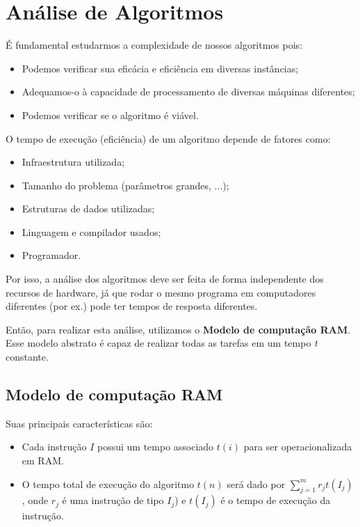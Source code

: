 \section{Análise de Algoritmos} 

É fundamental estudarmos a complexidade de nossos algoritmos pois:

\begin{itemize}
  \item Podemos verificar sua eficácia e eficiência em diversas instâncias;
  \item Adequamos-o à capacidade de processamento de diversas máquinas diferentes;
  \item Podemos verificar se o algoritmo é viável.
\end{itemize}

O tempo de execução (eficiência) de um algoritmo depende de fatores como:

\begin{itemize}
  \item Infraestrutura utilizada;
  \item Tamanho do problema (parâmetros grandes, ...);
  \item Estruturas de dados utilizadas;
  \item Linguagem e compilador usados;
  \item Programador.
\end{itemize}

Por isso, a análise dos algoritmos deve ser feita de forma independente dos recursos de hardware, já que rodar o mesmo programa em computadores diferentes (por ex.) pode ter tempos de resposta diferentes.

Então, para realizar esta análise, utilizamos o \textbf{Modelo de computação RAM}. Esse modelo abstrato é capaz de realizar todas as tarefas em um tempo \textit{t} constante.

\subsection{Modelo de computação RAM}
Suas principais características são:
\begin{itemize}
  \item Cada instrução $I$ possui um tempo associado $t(i)$ para ser operacionalizada em RAM.
  \item O tempo total de execução do algoritmo $t(n)$ será dado por $\sum_{j=1}^{m} r_j t(I_j)$, onde $r_j$ é uma instrução de tipo $I_j$) e $t(I_j)$ é o tempo de execução da instrução.
\end{itemize}

